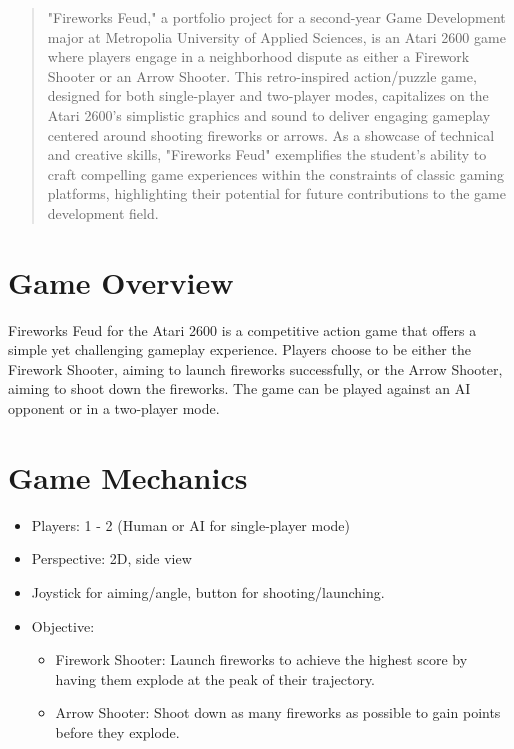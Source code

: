 \documentclass{article}
\begin{document}
\begin{abstract}
"Fireworks Feud," a portfolio project for a second-year Game Development major at Metropolia University of Applied Sciences, is an Atari 2600 game where players engage in a neighborhood dispute as either a Firework Shooter or an Arrow Shooter. This retro-inspired action/puzzle game, designed for both single-player and two-player modes, capitalizes on the Atari 2600's simplistic graphics and sound to deliver engaging gameplay centered around shooting fireworks or arrows. As a showcase of technical and creative skills, "Fireworks Feud" exemplifies the student's ability to craft compelling game experiences within the constraints of classic gaming platforms, highlighting their potential for future contributions to the game development field.
\end{abstract}







\newpage

\tableofcontents

\newpage




\section{Game Overview}
Fireworks Feud for the Atari 2600 is a competitive action game that offers a simple yet challenging gameplay experience. Players choose to be either the Firework Shooter, aiming to launch fireworks successfully, or the Arrow Shooter, aiming to shoot down the fireworks. The game can be played against an AI opponent or in a two-player mode.


%


\section{Game Mechanics}
\begin{itemize}
  \item Players: 1 - 2 (Human or AI for single-player mode)
  \item Perspective: 2D, side view
  \item Joystick for aiming/angle, button for shooting/launching.
  \item Objective:
    \begin{itemize}
      \item Firework Shooter: Launch fireworks to achieve the highest score by having them explode at the peak of their trajectory.
      \item Arrow Shooter: Shoot down as many fireworks as possible to gain points before they explode.
    \end{itemize}
\end{itemize}
\end{document}
